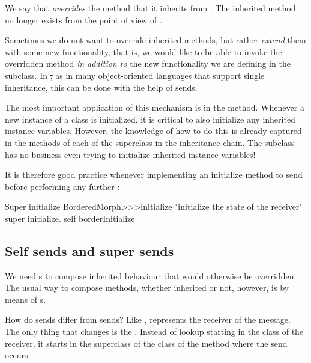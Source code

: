 \documentclass[a4paper,10pt,twoside]{book}
\begin{document}
We say that  \emph{overrides} the  method that it inherits from .
The inherited method no longer exists from the point of view of .

Sometimes we do not want to override inherited methods, but rather \emph{extend} them with some new functionality, that is, we would like to be able to invoke the overridden method \emph{in addition to} the new functionality we are defining in the subclass.
In \st, as in many object-oriented languages that support single inheritance, this can be done with the help of \super sends.

The most important application of this mechanism is in the  method.
Whenever a new instance of a class is initialized, it is critical to also initialize any inherited instance variables.
However, the knowledge of how to do this is already captured in the  methods of each of the superclass in the inheritance chain.
The subclass has no business even trying to initialize inherited instance variables!

It is therefore good practice whenever implementing an initialize method to send  before performing any further :

\begin{method}[morphinit]{Super initialize}
BorderedMorph>>>initialize
	"initialize the state of the receiver"
	super initialize.
	self borderInitialize
\end{method}


\subsection{Self sends and super sends}

We need \super {}s to compose inherited behaviour that would otherwise be overridden.
The usual way to compose methods, whether inherited or not, however, is by means of \self {}s.

How do \self sends differ from \super sends?
Like \self, \super represents the receiver of the message.
The only thing that changes is the .
Instead of lookup starting in the class of the receiver, it starts in the superclass of the class of the method where the \super send occurs.
\end{document}
